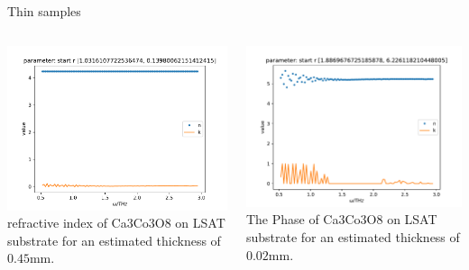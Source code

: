 \documentclass[aspectratio=1610, 9pt]{beamer}
\begin{document}
\begin{frame}{Thin samples}
  \begin{columns}
    \begin{column}{0.33\textwidth}
      \includegraphics[width=\textwidth]{images/2donSub/frequncy_against_n_k_0.45mm.pdf}
      {refractive index of Ca3Co3O8 on LSAT substrate for an estimated thickness of $0.45\si{\milli\meter}$.}
    \end{column} 
    \begin{column}{0.33\textwidth}
      \includegraphics[width=\textwidth]{images/2donSub/frequncy_against_n_k0.02mm.pdf}
      {The Phase of Ca3Co3O8 on LSAT substrate for an estimated thickness of $0.02\si{\milli\meter}$.}
    \end{column}

\end{columns}
\end{frame}
\end{document}
